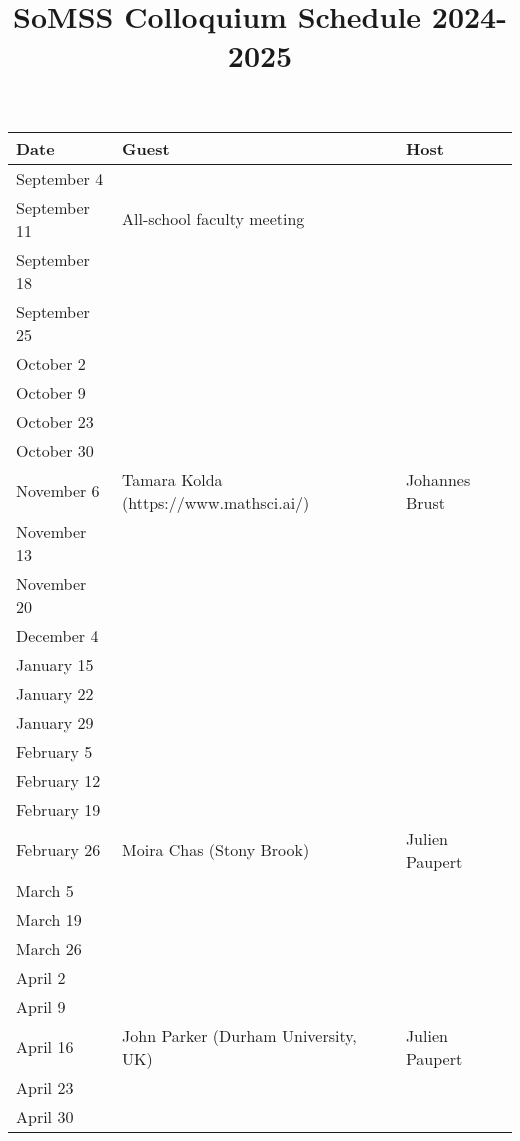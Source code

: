\documentclass[11pt]{article}
\begin{document}
\title{SoMSS Colloquium Schedule 2024-2025}
\author{}
\date{}
\maketitle



\begin{table}[htp]
\begin{center}
\begin{tabular}{|l|l|l|}
\hline
Date & Guest & Host\\
\hline
September 4 & & \\
September 11 & All-school faculty meeting & \\
September 18 & & \\
September 25 & & \\
October 2 & & \\
October 9 & & \\
October 23 & & \\
October 30 & & \\
November 6 & Tamara Kolda (https://www.mathsci.ai/) & Johannes Brust\\
November 13 & & \\
November 20 & & \\
December 4 & & \\
January 15 & & \\
January 22 & & \\
January 29 & & \\
February 5 & & \\
February 12 & & \\
February 19 & & \\
February 26  & Moira Chas (Stony Brook) & Julien Paupert \\
March 5 & & \\
March 19 & & \\
March 26 & & \\
April 2 & & \\
April 9 & & \\
April 16 & John Parker (Durham University, UK)& Julien Paupert \\
April 23 & & \\
April 30 & & \\
\hline
\end{tabular}
\end{center}
\label{default}
\end{table}%
\end{document}
